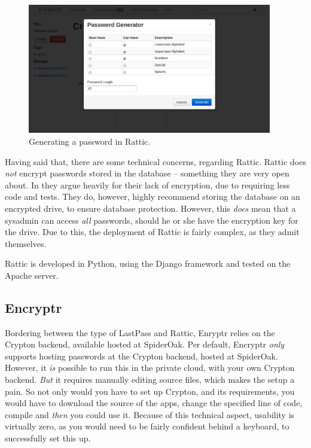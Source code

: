 			\begin{figure}[h!]
				\centering
				\includegraphics[width=0.95\textwidth]{figures/analysis/rattic_newpassword_passwordgen.png}
				\caption{Generating a password in Rattic.}
				\label{fig:rattic_newpassword_passwordgen}
			\end{figure}

			Having said that, there are some technical concerns, regarding Rattic. Rattic does \emph{not} encrypt passwords stored in the database -- something they are very open about. In \cite{rattic_encryption} they argue heavily for their lack of encryption, due to requiring less code and tests. They do, however, highly recommend storing the database on an encrypted drive, to ensure database protection. However, this \emph{does} mean that a sysadmin can access \emph{all} passwords, should he or she have the encryption key for the drive. Due to this, the deployment of Rattic is fairly complex, as they admit themselves. 

			Rattic is developed in Python, using the Django framework and tested on the Apache server.

		\subsection*{Encryptr}
			Bordering between the type of LastPass and Rattic, Enryptr \cite{encryptr} relies on the Crypton\cite{crypton} backend\cite{encryptr_backend}, available hosted at SpiderOak\cite{crypton_spideroak}. Per default, Encryptr \emph{only} supports hosting passwords at the Crypton backend, hosted at SpiderOak. However, it \emph{is} possible to run this in the private cloud, with your own Crypton backend. \emph{But} it requires manually editing source files\cite{encryptr_selfhost}, which makes the setup a pain. So not only would you have to set up Crypton, and its requirements, you would have to download the source of the apps, change the specified line of code, compile and \emph{then} you could use it. Because of this technical aspect, usability is virtually zero, as you would need to be fairly confident behind a keyboard, to successfully set this up.

